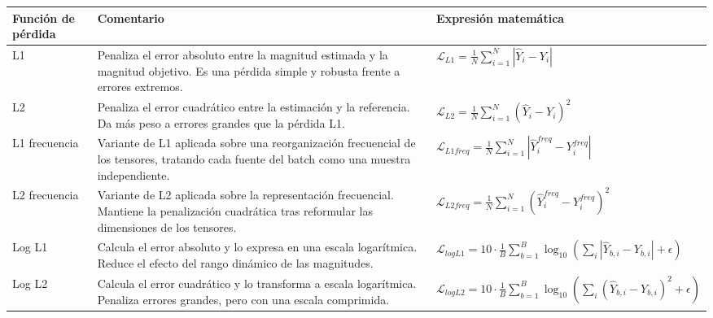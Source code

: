 \begin{table}[H]
    \centering
    \small
    \begin{adjustbox}{
        max width=\textwidth,
        max totalheight=0.80\textheight,
        keepaspectratio
        }
        \begin{tabular}{p{} p{} p{}}
            \toprule
            \textbf{Función de pérdida} & \textbf{Comentario} & \textbf{Expresión matemática} \\
            \midrule

            L1 &
            Penaliza el error absoluto entre la magnitud estimada y la magnitud objetivo. Es una pérdida simple y robusta frente a errores extremos. &
            \( \mathcal{L}_{L1} = \frac{1}{N}\sum_{i=1}^{N} |\hat{Y}_i - Y_i| \)
            \\

            L2 &
            Penaliza el error cuadrático entre la estimación y la referencia. Da más peso a errores grandes que la pérdida L1. &
            \( \mathcal{L}_{L2} = \frac{1}{N}\sum_{i=1}^{N} (\hat{Y}_i - Y_i)^2 \)
            \\

            L1 frecuencia &
            Variante de L1 aplicada sobre una reorganización frecuencial de los tensores, tratando cada fuente del batch como una muestra independiente. &
            \( \mathcal{L}_{L1freq} = \frac{1}{N}\sum_{i=1}^{N} |\hat{Y}^{freq}_i - Y^{freq}_i| \)
            \\

            L2 frecuencia &
            Variante de L2 aplicada sobre la representación frecuencial. Mantiene la penalización cuadrática tras reformular las dimensiones de los tensores. &
            \( \mathcal{L}_{L2freq} = \frac{1}{N}\sum_{i=1}^{N} (\hat{Y}^{freq}_i - Y^{freq}_i)^2 \)
            \\

            Log L1 &
            Calcula el error absoluto y lo expresa en una escala logarítmica. Reduce el efecto del rango dinámico de las magnitudes. &
            \( \mathcal{L}_{logL1} = 10 \cdot \frac{1}{B}\sum_{b=1}^{B}\log_{10}\left(\sum_i |\hat{Y}_{b,i}-Y_{b,i}|+\epsilon\right) \)
            \\

            Log L2 &
            Calcula el error cuadrático y lo transforma a escala logarítmica. Penaliza errores grandes, pero con una escala comprimida. &
            \( \mathcal{L}_{logL2} = 10 \cdot \frac{1}{B}\sum_{b=1}^{B}\log_{10}\left(\sum_i (\hat{Y}_{b,i}-Y_{b,i})^2+\epsilon\right) \)
            \\


\end{tabular}
\end{adjustbox}
\end{table}
